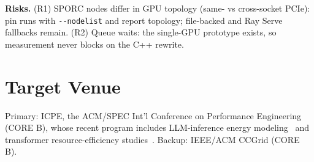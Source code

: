 \documentclass[conference,10pt]{IEEEtran}
\begin{document}
\textbf{Risks.} (R1) SPORC nodes differ in GPU topology (same- vs cross-socket PCIe): pin runs with \texttt{-{}-nodelist} and report topology; file-backed and Ray Serve fallbacks remain. (R2) Queue waits: the single-GPU prototype exists, so measurement never blocks on the C++ rewrite.

\section{Target Venue}
Primary: ICPE, the ACM/SPEC Int'l Conference on Performance Engineering (CORE B), whose recent program includes LLM-inference energy modeling~\cite{cavagna2026sweetspot} and transformer resource-efficiency studies~\cite{wallace2025icpe}. Backup: IEEE/ACM CCGrid (CORE B).



\end{document}
